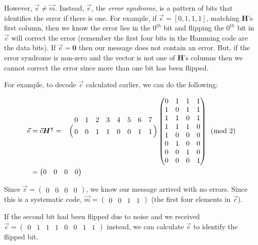 \documentclass[11pt]{article}
\begin{document}
However, $\Vec{e} \neq \Vec{m}$.
Instead, $\Vec{e}$, the \emph{error syndrome}, is a pattern of bits that identifies the error if there is one. For
example, if $\Vec{e} = [0, 1, 1, 1]$, matching $\boldsymbol{H}$'s first column, then we know the
error lies in the $0^{th}$ bit and flipping the $0^{th}$ bit in $\Vec{c}$ will correct the error
(remember the first four bits in the Hamming code are the data bits). If
$\Vec{e} = \boldsymbol{0}$ then
our message does not contain an error. But, if the error syndrome is non-zero and the vector
is not one of $\boldsymbol{H}$'s columns then we cannot correct the error since more than one bit has been
flipped.

For example, to decode $\Vec{c}$ calculated earlier, we can do the following:

\begin{align*}
    \Vec{e}&=\Vec{c}\boldsymbol{H^{\intercal}} =
    \bordermatrix{~ & 0 & 1 & 2 & 3 & 4 & 5 & 6 & 7\cr
        ~ & 0 & 0 & 1 & 1 & 0 & 0 & 1 & 1 \cr} 
    \begin{pmatrix}
         0 & 1 & 1 & 1 \\
         1 & 0 & 1 & 1 \\
         1 & 1 & 0 & 1 \\
         1 & 1 & 1 & 0 \\
         1 & 0 & 0 & 0 \\
         0 & 1 & 0 & 0 \\
         0 & 0 & 1 & 0 \\
         0 & 0 & 0 & 1
    \end{pmatrix} \pmod{2} \\
    &= \begin{pmatrix}0 & 0 & 0 & 0 \end{pmatrix}
\end{align*}

\noindent Since $\Vec{e} = \begin{pmatrix}0 & 0 & 0 & 0 \end{pmatrix}$, we know our message arrived with
no errors. Since this is a systematic code, $\Vec{m} = \begin{pmatrix}0 & 0 & 1 & 1 \end{pmatrix}$
(the first four elements in $\Vec{c}$).

If the second bit had been flipped due to noise and we received 
$\Vec{c} = \begin{pmatrix}0 & 1 & 1 & 1 & 0 & 0 & 1 & 1\end{pmatrix}$ instead,
we can calculate $\Vec{e}$ to identify the flipped bit.
\end{document}
